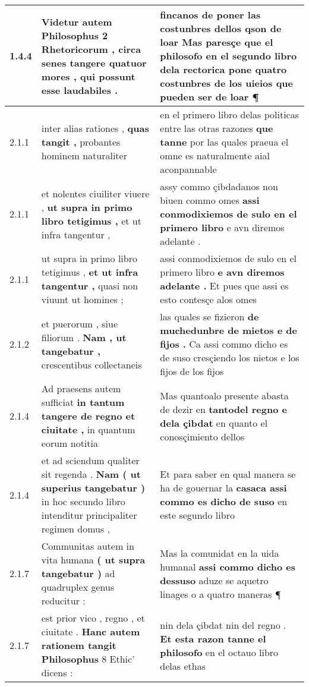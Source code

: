 \begin{tabular}{|p{1cm}|p{6.5cm}|p{6.5cm}|}
1.4.4 & Videtur autem Philosophus 2 Rhetoricorum , \textbf{ circa senes tangere quatuor mores , } qui possunt esse laudabiles . & fincanos de poner las costunbres dellos qson de loar \textbf{ Mas paresçe que el philosofo en el segundo libro dela rectorica pone quatro costunbres de los uieios } que pueden ser de loar ¶ \\\hline
2.1.1 & inter alias rationes , \textbf{ quas tangit , } probantes hominem naturaliter & en el primero libro delas politicas entre las otras razones \textbf{ que tanne } por las quales praeua el omne es naturalmente aial aconpannable \\\hline
2.1.1 & et nolentes ciuiliter viuere , \textbf{ ut supra in primo libro tetigimus , } et ut infra tangentur , & assy commo çibdadanos non biuen commo omes \textbf{ assi conmodixiemos de sulo en el primero libro } e avn diremos adelante . \\\hline
2.1.1 & ut supra in primo libro tetigimus , \textbf{ et ut infra tangentur , } quasi non viuunt ut homines ; & assi conmodixiemos de sulo en el primero libro \textbf{ e avn diremos adelante . } Et pues que assi es esto contesçe alos omes \\\hline
2.1.2 & et puerorum , siue filiorum . \textbf{ Nam , ut tangebatur , } crescentibus collectaneis & las quales se fizieron \textbf{ de muchedunbre de mietos e de fijos . } Ca assi commo dicho es de suso cresçiendo los nietos e los fijos de los fijos \\\hline
2.1.4 & Ad praesens autem sufficiat \textbf{ in tantum tangere de regno et ciuitate , } in quantum eorum notitia & Mas quantoalo presente abasta de dezir en \textbf{ tantodel regno e dela çibdat } en quanto el conosçimiento dellos \\\hline
2.1.4 & et ad sciendum qualiter sit regenda . \textbf{ Nam ( ut superius tangebatur ) } in hoc secundo libro intenditur principaliter regimen domus , & Et para saber en qual manera se ha de gouernar la \textbf{ casaca assi commo es dicho de suso } en este segundo libro \\\hline
2.1.7 & Communitas autem in vita humana \textbf{ ( ut supra tangebatur ) } ad quadruplex genus reducitur : & Mas la comunidat en la uida humanal \textbf{ assi commo dicho es dessuso } aduze se aquetro linages o a quatro maneras ¶ \\\hline
2.1.7 & est prior vico , regno , et ciuitate . \textbf{ Hanc autem rationem tangit Philosophus } 8 Ethic’ dicens : & nin dela çibdat nin del regno . \textbf{ Et esta razon tanne el philosofo } en el octauo libro delas ethas \\\hline

\end{tabular}
